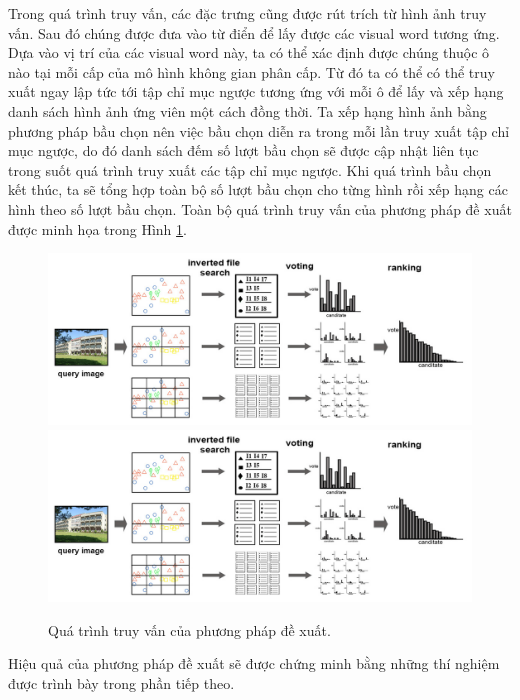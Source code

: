 Trong quá trình truy vấn, các đặc trưng cũng được rút trích từ hình ảnh truy vấn. Sau đó chúng được đưa vào từ điển để lấy được các visual word tương ứng. Dựa vào vị trí của các visual word này, ta có thể xác định được chúng thuộc ô nào tại mỗi cấp của mô hình không gian phân cấp. Từ đó ta có thể có thể truy xuất ngay lập tức tới tập chỉ mục ngược tương ứng với mỗi ô để lấy và xếp hạng danh sách hình ảnh ứng viên một cách đồng thời. Ta xếp hạng hình ảnh bằng phương pháp bầu chọn nên việc bầu chọn diễn ra trong mỗi lần truy xuất tập chỉ mục ngược, do đó danh sách đếm số lượt bầu chọn sẽ được cập nhật liên tục trong suốt quá trình truy xuất các tập chỉ mục ngược. Khi quá trình bầu chọn kết thúc, ta sẽ tổng hợp toàn bộ số lượt bầu chọn cho từng hình rồi xếp hạng các hình theo số lượt bầu chọn. Toàn bộ quá trình truy vấn của phương pháp đề xuất được minh họa trong Hình \ref{FigQueryProcess}.

\begin{figure}[!htbp]
  \begin{center}
    \leavevmode
    \ifpdf
      \includegraphics[scale=0.35]{queryProcess}
    \else
      \includegraphics[scale=0.35]{queryProcess}
    \fi
    \caption[Quá trình truy vấn của phương pháp đề xuất]{Quá trình truy vấn của phương pháp đề xuất.}
    \label{FigQueryProcess}
  \end{center}
\end{figure}

Hiệu quả của phương pháp đề xuất sẽ được chứng minh bằng những thí nghiệm được trình bày trong phần tiếp theo.